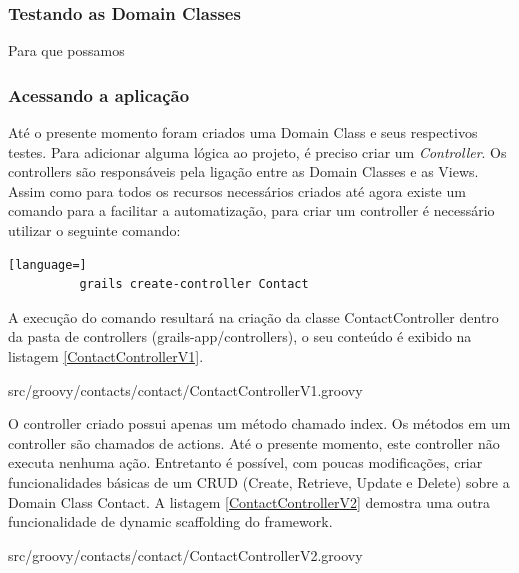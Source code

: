 \documentclass[12pt]{article}
\begin{document}
    
\subsubsection{Testando as Domain Classes}

    Para que possamos
    
\subsubsection{Acessando a aplicação}

    Até o presente momento foram criados uma Domain Class e seus respectivos testes.
    Para adicionar alguma lógica ao projeto, é preciso criar um \emph{Controller}.
    Os controllers são responsáveis pela ligação entre as Domain Classes e as Views.
    Assim como para todos os recursos necessários criados até agora existe um comando
    para a facilitar a automatização, para criar um controller é necessário utilizar
    o seguinte comando:
    
    \begin{lstlisting}[language=]
          grails create-controller Contact
    \end{lstlisting}
    
    A execução do comando resultará na criação da classe ContactController dentro
    da pasta de controllers (grails-app/controllers), o seu conteúdo é exibido na
    listagem \ref{ContactControllerV1}.
    
    
                   {src/groovy/contacts/contact/ContactControllerV1.groovy}
                   
    O controller criado possui apenas um método chamado index. Os métodos em um 
    controller são chamados de actions. Até o presente momento, este controller
    não executa nenhuma ação. Entretanto é possível, com poucas modificações, criar
    funcionalidades básicas de um CRUD (Create, Retrieve, Update e Delete) sobre 
    a Domain Class Contact. A listagem \ref{ContactControllerV2} demostra uma outra
    funcionalidade de dynamic scaffolding do framework. 
    
    
                   {src/groovy/contacts/contact/ContactControllerV2.groovy}
\end{document}
